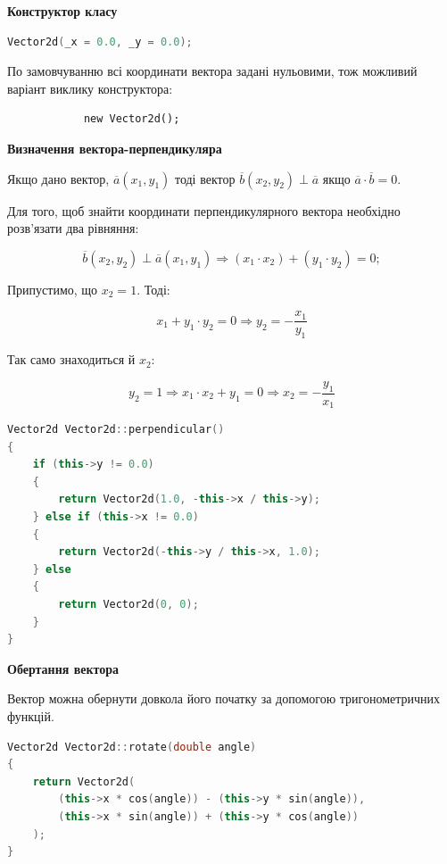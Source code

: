 \documentclass[simple,a4paper,14pt,ukrainian,utf8]{eskdtext}
\begin{document}
        	\textbf{Конструктор класу}

            \begin{lstlisting}[language=C++]
            Vector2d(_x = 0.0, _y = 0.0);
            \end{lstlisting}

            По замовчуванню всі координати вектора задані нульовими, тож можливий варіант виклику конструктора:

            \begin{lstlisting}
            new Vector2d(); 
            \end{lstlisting}     	
     	
	     	\textbf{Визначення вектора-перпендикуляра}
	     	
	     	Якщо дано вектор, $\overline{a} (x_1, y_1)$ тоді вектор $\overline{b} (x_2, y_2) \perp \overline{a}$ якщо $\overline{a} \cdot \overline{b} = 0$.
	     	
	     	Для того, щоб знайти координати перпендикулярного вектора необхідно розв’язати два рівняння:
	     	
	     	$$
	     		\overline{b}(x_2, y_2) \perp \overline{a}(x_1, y_1) \Rightarrow (x_1 \cdot x_2) + (y_1 \cdot y_2) = 0;
	     	$$
	     	
			Припустимо, що $x_2 = 1$. Тоді:
	     	
	     	$$
	     		x_1 + y_1 \cdot y_2 = 0 \Rightarrow y_2 = -\frac{x_1}{y_1}
	     	$$
	     	
	     	Так само знаходиться й $x_2$:
	     	
	     	$$
	     		y_2 = 1 \Rightarrow x_1 \cdot x_2 + y_1 = 0 \Rightarrow x_2 = -\frac{y_1}{x_1}
	     	$$
	     	
\begin{small}
\begin{lstlisting}[language=C++]
Vector2d Vector2d::perpendicular()
{
    if (this->y != 0.0)
    {
        return Vector2d(1.0, -this->x / this->y);
    } else if (this->x != 0.0)
    {
        return Vector2d(-this->y / this->x, 1.0);
    } else
    {
        return Vector2d(0, 0);
    }
}
\end{lstlisting}
\end{small}
	     	
	    \textbf{Обертання вектора}
	    
	    Вектор можна обернути довкола його початку за допомогою тригонометричних функцій.
	    
\begin{small}
\begin{lstlisting}[language=C++]
Vector2d Vector2d::rotate(double angle)
{
    return Vector2d(
        (this->x * cos(angle)) - (this->y * sin(angle)),
        (this->x * sin(angle)) + (this->y * cos(angle))
    );
}
\end{lstlisting}
\end{small}
     	
\end{document}
